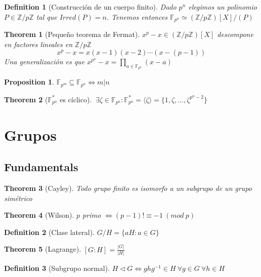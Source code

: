 \documentclass[leqno]{article}
\newtheorem*{theorem}{Theorem}
\newtheorem*{proposition}{Proposition}
\newtheorem*{definition}{Definition}
\begin{document}
\begin{definition}[Construcción de un cuerpo finito] Dado $p^n$ elegimos un polinomio  $P\in \mathbb{Z}/p\mathbb{Z}$ tal que  $Irred(P)=n$. Tenemos entonces $\mathbb{F}_{p^{n}} \simeq (\mathbb{Z}/p\mathbb{Z})[X]/(P)$

\end{definition}

\begin{theorem}[Pequeño teorema de Fermat]
$x^p-x\in (\mathbb{Z}/p\mathbb{Z})[X]$ descompone en factores lineales en $\mathbb{Z}/p\mathbb{Z}$ 
\[
x^p-x = x(x-1)(x-2)\cdots(x-(p-1))
\] 
Una generalización es que $\displaystyle x^{p^n}-x = \prod_{a\in \mathbb{F}_{p^n}} (x-a)$
\end{theorem}

\begin{proposition}
$\mathbb{F}_{p^m}\subseteq  \mathbb{F}_{p^n} \iff m|n$ 
\end{proposition}

\begin{theorem}[$\mathbb{F}^*_{p^n}$ es cíclico] $\ \exists \zeta \in \mathbb{F}_{p^n} : \mathbb{F}^*_{p^n} = \langle \zeta \rangle = \{1, \zeta, \ldots, \zeta^{p^n-2}\} $

\end{theorem}


\section{Grupos}

\subsection{Fundamentals}
\begin{theorem}[Cayley]
Todo grupo finito es isomorfo a un subgrupo de un grupo simétrico
\end{theorem}

\begin{theorem}[Wilson]
$p$ primo $\iff (p-1)! \equiv -1\ (mod \ p)$ 
\end{theorem}

\begin{definition}[Clase lateral] $G / H = \{aH: a\in G\}$
\end{definition}

\begin{theorem}[Lagrange]  $[G:H] = \frac{|G|}{|H|}$
\end{theorem}

\begin{definition}[Subgrupo normal] $H \triangleleft G \iff ghg^{-1}\in H \ \forall g\in G \ \forall h\in H$
\end{definition}
\end{document}
